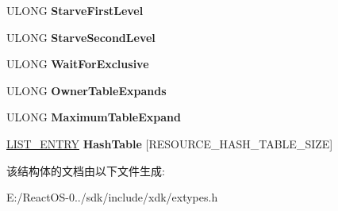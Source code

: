 \begin{DoxyCompactItemize}
U\+L\+O\+NG {\bfseries Starve\+First\+Level}
\item 
\mbox{\label{struct___r_e_s_o_u_r_c_e___p_e_r_f_o_r_m_a_n_c_e___d_a_t_a_aafcebd554c318ae3e9822b48df01d1f2}} 
U\+L\+O\+NG {\bfseries Starve\+Second\+Level}
\item 
\mbox{\label{struct___r_e_s_o_u_r_c_e___p_e_r_f_o_r_m_a_n_c_e___d_a_t_a_a617aabd2cea56b54b15753e228fe9bec}} 
U\+L\+O\+NG {\bfseries Wait\+For\+Exclusive}
\item 
\mbox{\label{struct___r_e_s_o_u_r_c_e___p_e_r_f_o_r_m_a_n_c_e___d_a_t_a_a2d125524b934c2933be97c42ce7ca7b8}} 
U\+L\+O\+NG {\bfseries Owner\+Table\+Expands}
\item 
\mbox{\label{struct___r_e_s_o_u_r_c_e___p_e_r_f_o_r_m_a_n_c_e___d_a_t_a_a413f3c908c96977fcddc2c1bf2da2bbd}} 
U\+L\+O\+NG {\bfseries Maximum\+Table\+Expand}
\item 
\mbox{\label{struct___r_e_s_o_u_r_c_e___p_e_r_f_o_r_m_a_n_c_e___d_a_t_a_ac887c8f48ed2fcd26c903b854bd2c968}} 
\hyperlink{struct___l_i_s_t___e_n_t_r_y}{L\+I\+S\+T\+\_\+\+E\+N\+T\+RY} {\bfseries Hash\+Table} \mbox{[}R\+E\+S\+O\+U\+R\+C\+E\+\_\+\+H\+A\+S\+H\+\_\+\+T\+A\+B\+L\+E\+\_\+\+S\+I\+ZE\mbox{]}
\end{DoxyCompactItemize}


该结构体的文档由以下文件生成\+:\begin{DoxyCompactItemize}
\item 
E\+:/\+React\+O\+S-\/0../sdk/include/xdk/extypes.\+h\end{DoxyCompactItemize}
